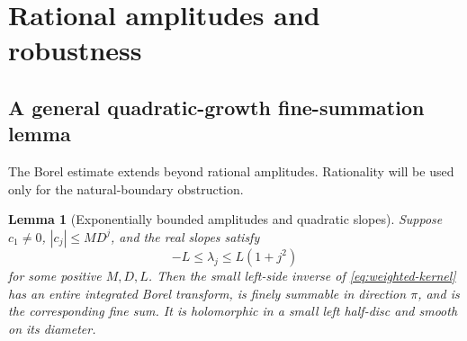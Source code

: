 \documentclass[11pt,a4paper]{article}
\numberwithin{equation}{section}
\newtheorem{lemma}[theorem]{Lemma}
\theoremstyle{definition}
\theoremstyle{remark}
\begin{document}
\section{Rational amplitudes and robustness}
\label{sec:rational}

\subsection{A general quadratic-growth fine-summation lemma}
The Borel estimate extends beyond rational amplitudes.  Rationality will
be used only for the natural-boundary obstruction.

\begin{lemma}[Exponentially bounded amplitudes and quadratic slopes]
\label{lem:weighted-borel}
Suppose $c_1\ne0$, $|c_j|\le M D^j$, and the real slopes satisfy
\[
 -L\le\lambda_j\le L(1+j^2)
\]
for some positive $M,D,L$.  Then the small left-side inverse of
\eqref{eq:weighted-kernel} has an entire integrated Borel transform,
is finely summable in direction $\pi$, and is the corresponding fine
sum.  It is holomorphic in a small left half-disc and smooth on its
diameter.
\end{lemma}
\end{document}
